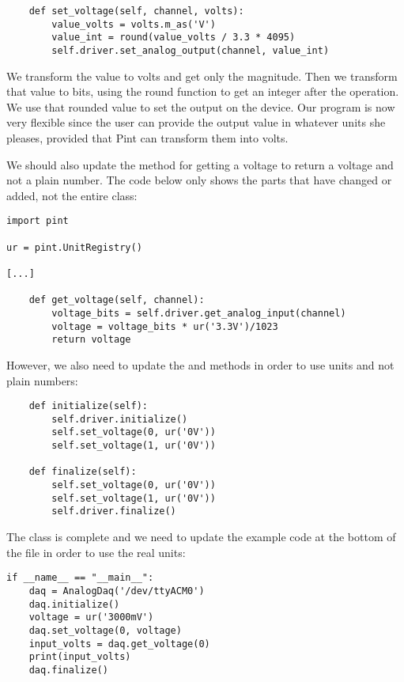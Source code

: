 \begin{verbatim}
    def set_voltage(self, channel, volts):
        value_volts = volts.m_as('V')
        value_int = round(value_volts / 3.3 * 4095)
        self.driver.set_analog_output(channel, value_int)
\end{verbatim}

We transform the value to volts and get only the magnitude. Then we transform that value to bits, using the round function to get an integer after the operation. We use that rounded value to set the output on the device. Our program is now very flexible since the user can provide the output value in whatever units she pleases, provided that Pint can transform them into volts.


We should also update the method for getting a voltage to return a voltage and not a plain number. The code below only shows the parts that have changed or added, not the entire class:

\begin{verbatim}
import pint

ur = pint.UnitRegistry()

[...]

    def get_voltage(self, channel):
        voltage_bits = self.driver.get_analog_input(channel)
        voltage = voltage_bits * ur('3.3V')/1023
        return voltage
\end{verbatim}

However, we also need to update the  and  methods in order to use units and not plain numbers:

\begin{verbatim}
    def initialize(self):
        self.driver.initialize()
        self.set_voltage(0, ur('0V'))
        self.set_voltage(1, ur('0V'))

    def finalize(self):
        self.set_voltage(0, ur('0V'))
        self.set_voltage(1, ur('0V'))
        self.driver.finalize()
\end{verbatim}

The class is complete and we need to update the example code at the bottom of the file in order to use the real units:

\begin{verbatim}
if __name__ == "__main__":
    daq = AnalogDaq('/dev/ttyACM0')
    daq.initialize()
    voltage = ur('3000mV')
    daq.set_voltage(0, voltage)
    input_volts = daq.get_voltage(0)
    print(input_volts)
    daq.finalize()
\end{verbatim}

